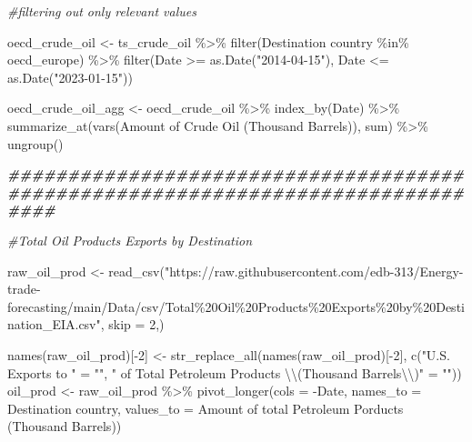 \documentclass[
]{article}
\newenvironment{Shaded}{\begin{snugshade}}{\end{snugshade}}
\newcommand{\AttributeTok}[1]{\textcolor[rgb]{0.77,0.63,0.00}{#1}}
\newcommand{\CommentTok}[1]{\textcolor[rgb]{0.56,0.35,0.01}{\textit{#1}}}
\newcommand{\DecValTok}[1]{\textcolor[rgb]{0.00,0.00,0.81}{#1}}
\newcommand{\DocumentationTok}[1]{\textcolor[rgb]{0.56,0.35,0.01}{\textbf{\textit{#1}}}}
\newcommand{\FunctionTok}[1]{\textcolor[rgb]{0.00,0.00,0.00}{#1}}
\newcommand{\NormalTok}[1]{#1}
\newcommand{\OtherTok}[1]{\textcolor[rgb]{0.56,0.35,0.01}{#1}}
\newcommand{\SpecialCharTok}[1]{\textcolor[rgb]{0.00,0.00,0.00}{#1}}
\newcommand{\StringTok}[1]{\textcolor[rgb]{0.31,0.60,0.02}{#1}}
\begin{document}
\begin{Shaded}
\begin{Highlighting}[]
\CommentTok{\#filtering out only relevant values}

\NormalTok{oecd\_crude\_oil }\OtherTok{\textless{}{-}}\NormalTok{ ts\_crude\_oil }\SpecialCharTok{\%\textgreater{}\%}
  \FunctionTok{filter}\NormalTok{(}\StringTok{\textasciigrave{}}\AttributeTok{Destination country}\StringTok{\textasciigrave{}} \SpecialCharTok{\%in\%}\NormalTok{ oecd\_europe) }\SpecialCharTok{\%\textgreater{}\%} 
  \FunctionTok{filter}\NormalTok{(Date }\SpecialCharTok{\textgreater{}=} \FunctionTok{as.Date}\NormalTok{(}\StringTok{"2014{-}04{-}15"}\NormalTok{), Date }\SpecialCharTok{\textless{}=} \FunctionTok{as.Date}\NormalTok{(}\StringTok{"2023{-}01{-}15"}\NormalTok{)) }

\NormalTok{oecd\_crude\_oil\_agg }\OtherTok{\textless{}{-}}\NormalTok{ oecd\_crude\_oil }\SpecialCharTok{\%\textgreater{}\%}
  \FunctionTok{index\_by}\NormalTok{(Date) }\SpecialCharTok{\%\textgreater{}\%}
  \FunctionTok{summarize\_at}\NormalTok{(}\FunctionTok{vars}\NormalTok{(}\StringTok{\textasciigrave{}}\AttributeTok{Amount of Crude Oil (Thousand Barrels)}\StringTok{\textasciigrave{}}\NormalTok{), sum) }\SpecialCharTok{\%\textgreater{}\%}
  \FunctionTok{ungroup}\NormalTok{()}


\DocumentationTok{\#\#\#\#\#\#\#\#\#\#\#\#\#\#\#\#\#\#\#\#\#\#\#\#\#\#\#\#\#\#\#\#\#\#\#\#\#\#\#\#\#\#\#\#\#\#\#\#\#\#\#\#\#\#\#\#\#\#\#\#\#\#\#\#\#\#\#\#\#\#\#\#\#\#\#\#\#\#\#\#}

\CommentTok{\#Total Oil Products Exports by Destination}

\NormalTok{raw\_oil\_prod }\OtherTok{\textless{}{-}} \FunctionTok{read\_csv}\NormalTok{(}\StringTok{"https://raw.githubusercontent.com/edb{-}313/Energy{-}trade{-}forecasting/main/Data/csv/Total\%20Oil\%20Products\%20Exports\%20by\%20Destination\_EIA.csv"}\NormalTok{,  }\AttributeTok{skip =} \DecValTok{2}\NormalTok{,)}

\FunctionTok{names}\NormalTok{(raw\_oil\_prod)[}\SpecialCharTok{{-}}\DecValTok{2}\NormalTok{] }\OtherTok{\textless{}{-}} \FunctionTok{str\_replace\_all}\NormalTok{(}\FunctionTok{names}\NormalTok{(raw\_oil\_prod)[}\SpecialCharTok{{-}}\DecValTok{2}\NormalTok{],}
                                           \FunctionTok{c}\NormalTok{(}\StringTok{"U.S. Exports to "} \OtherTok{=} \StringTok{""}\NormalTok{,}
                                             \StringTok{" of Total Petroleum Products }\SpecialCharTok{\textbackslash{}\textbackslash{}}\StringTok{(Thousand Barrels}\SpecialCharTok{\textbackslash{}\textbackslash{}}\StringTok{)"} \OtherTok{=} \StringTok{""}\NormalTok{))}
\NormalTok{oil\_prod }\OtherTok{\textless{}{-}}\NormalTok{ raw\_oil\_prod }\SpecialCharTok{\%\textgreater{}\%} 
  \FunctionTok{pivot\_longer}\NormalTok{(}\AttributeTok{cols =} \SpecialCharTok{{-}}\NormalTok{Date,}
               \AttributeTok{names\_to =} \StringTok{\textquotesingle{}Destination country\textquotesingle{}}\NormalTok{,}
               \AttributeTok{values\_to =} \StringTok{\textquotesingle{}Amount of total Petroleum Porducts (Thousand Barrels)\textquotesingle{}}\NormalTok{)}



\end{Highlighting}
\end{Shaded}
\end{document}
